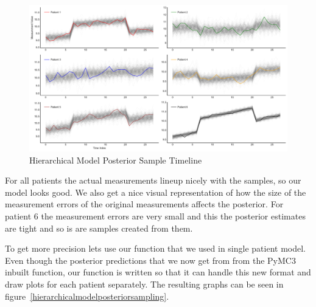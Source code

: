\documentclass[12pt,a4paper,leqno]{report}
\theoremstyle{plain}
\theoremstyle{definition}
\theoremstyle{remark}
\begin{document}
\bigskip
\begin{figure}[H]
    \caption{Hierarchical Model Posterior Sample Timeline}\label{hierarhicalmodelposteriortimeline}
    \bigskip
    \includegraphics[width=\textwidth,height=\textheight,keepaspectratio]{posterior_sample_timeline_hierarchical_model.pdf}
\end{figure}
\bigskip


For all patients the actual measurements lineup nicely with the samples, so our model
looks good. We also get a nice visual representation of how the size of the measurement errors of the
original measurements affects the posterior. For patient 6 the measurement errors are
very small and this the posterior estimates are tight and so is are samples created from
them.

To get more precision lets use our  function that we
used in single patient model. Even though the posterior predictions that we now get from
from the PyMC3 inbuilt  function, our function is written
so that it can handle this new format and draw plots for each patient separately. The
resulting graphs can be seen in figure\ \ref{hierarchicalmodelposteriorsampling}.
\end{document}
